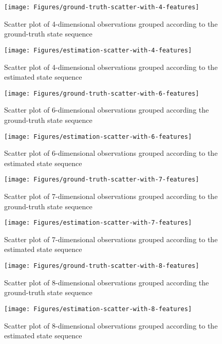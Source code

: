 \begin{figure}[ht!]
	\texttt{[image: Figures/ground-truth-scatter-with-4-features]}
	\caption{Scatter plot of 4-dimensional observations grouped according to the ground-truth state sequence}
	\label{fig:gt-4dim}
\end{figure}

\begin{figure}[ht!]
	\texttt{[image: Figures/estimation-scatter-with-4-features]}
	\caption{Scatter plot of 4-dimensional observations grouped according to the estimated state sequence}
	\label{fig:es-4dim}
\end{figure}

\begin{figure}[ht!]
	\texttt{[image: Figures/ground-truth-scatter-with-6-features]}
	\caption{Scatter plot of  6-dimensional observations grouped according the ground-truth state sequence}
	\label{fig:gt-6dim}
\end{figure}
\begin{figure}[ht!]
	\texttt{[image: Figures/estimation-scatter-with-6-features]}
	\caption{Scatter plot of 6-dimensional observations grouped according to the estimated state sequence}
	\label{fig:es-6dim}
\end{figure}

\begin{figure}[ht!]
	\texttt{[image: Figures/ground-truth-scatter-with-7-features]}
	\caption{Scatter plot of 7-dimensional observations grouped according to the ground-truth state sequence}
	\label{fig:gt-7dim}
\end{figure}

\begin{figure}[ht!]
	\texttt{[image: Figures/estimation-scatter-with-7-features]}
	\caption{Scatter plot of 7-dimensional observations grouped according to the estimated state sequence}
	\label{fig:es-7dim}
\end{figure}

\begin{figure}[ht!]
	\texttt{[image: Figures/ground-truth-scatter-with-8-features]}
	\caption{Scatter plot of  8-dimensional observations grouped according the ground-truth state sequence}
	\label{fig:gt-8dim}
\end{figure}
\begin{figure}[ht!]
	\texttt{[image: Figures/estimation-scatter-with-8-features]}
	\caption{Scatter plot of 8-dimensional observations grouped according to the estimated state sequence}
	\label{fig:es-8dim}
\end{figure}

